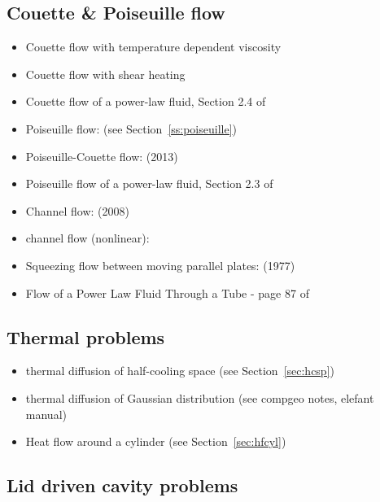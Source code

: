 \subsection{Couette \& Poiseuille flow}

\begin{itemize}
\item Couette flow with temperature dependent viscosity \cite{elga10,demh19}
\item Couette flow with shear heating \cite{elga10}
\item Couette flow of a power-law fluid, Section 2.4 of  \textcite{saramito}
\item Poiseuille flow: \cite{fojg94,fuku11,tagm09} (see Section~\ref{ss:poiseuille})
\item Poiseuille-Couette flow: \textcite{fusc13} (2013)
\item Poiseuille flow of a power-law fluid, Section 2.3 of  \textcite{saramito}
\item Channel flow: \textcite{manc08} (2008)
\item channel flow (nonlinear): \cite{geyu03,maie12,frbt19,gery10,elga10}
\item Squeezing flow between moving parallel plates: \textcite{gugu77} (1977)
\item Flow of a Power Law Fluid Through a Tube - page 87 of \textcite{macosko}
\end{itemize}



\subsection{Thermal problems}

\begin{itemize}
\item thermal diffusion of half-cooling space (see Section~\ref{sec:hcsp}) 
\item thermal diffusion of Gaussian distribution (see compgeo notes, elefant manual)
\item Heat flow around a cylinder (see Section~\ref{sec:hfcyl})
\end{itemize}

\subsection{Lid driven cavity problems}

